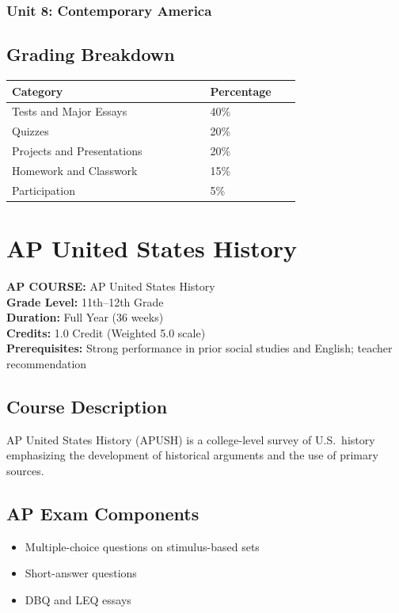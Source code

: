 \documentclass[12pt,oneside]{book}
\begin{document}
\subsection*{Unit 8: Contemporary America}

\section{Grading Breakdown}
\begin{center}
\begin{tabular}{L{0.55\linewidth}L{0.25\linewidth}}
\toprule
\textbf{Category} & \textbf{Percentage} \\
\midrule
Tests and Major Essays & 40\% \\
Quizzes & 20\% \\
Projects and Presentations & 20\% \\
Homework and Classwork & 15\% \\
Participation & 5\% \\
\bottomrule
\end{tabular}
\end{center}

\chapter{AP United States History}

\noindent\textbf{AP COURSE:} AP United States History\\
\textbf{Grade Level:} 11th--12th Grade\\
\textbf{Duration:} Full Year (36 weeks)\\
\textbf{Credits:} 1.0 Credit (Weighted 5.0 scale)\\
\textbf{Prerequisites:} Strong performance in prior social studies and English; teacher recommendation

\section{Course Description}
AP United States History (APUSH) is a college-level survey of U.S.\ history emphasizing the
development of historical arguments and the use of primary sources.

\section{AP Exam Components}
\begin{itemize}[leftmargin=2em]
    \item Multiple-choice questions on stimulus-based sets
    \item Short-answer questions
    \item DBQ and LEQ essays
\end{itemize}
\end{document}
